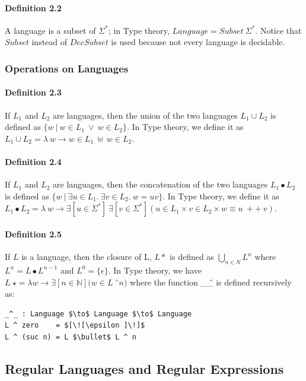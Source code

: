 \documentclass[twoside,openright,final]{bhamthesis}
\begin{document}
\paragraph{Definition 2.2} A language is a subset of 
\(\Sigma^*\); in Type theory, \(Language = Subset\ \Sigma^*\). 
Notice that \(Subset\) instead of \(DecSubset\) is used because not every language is decidable. 

\subsubsection{Operations on Languages}

\paragraph{Definition 2.3} If \(L_1\) and \(L_2\) are languages, then
the union of the two languages \(L_1\cup L_2\) is defined as \(\{w\
|\  w \in L_1\ \vee \ w \in
L_2\}\). In Type theory, we define it as \(L_1 \cup L_2 = \lambda\ w
\to w \in L_1\ \uplus\ w \in L_2\).

\paragraph{Definition 2.4} If \(L_1\) and \(L_2\) are languages, then
the concatenation of the two languages \(L_1\bullet L_2\) is defined
as \(\{w\  |\  \exists u\in L_1.\ \exists v\in L_2.\ w = uv\}\). In
Type theory, we define it as \(L_1\bullet L_2 = \lambda\ w \to \exists[
u \in \Sigma^* ]\ \exists[ v \in \Sigma^* ] ( u \in L_1 \times v \in L_2 \times w \equiv u\ ++\ v ) \).

\paragraph{Definition 2.5} If \(L\) is a language, then the closure of
L, \(L\ast\) is defined as \( \bigcup_{n \in N} L^n \) where
\( L^n = L\bullet L^{n - 1} \) and \(L^0 = \{\epsilon\}\). In Type
theory, we have \(L\ \star = \lambda w \to \exists [ n \in \mathbb{N}
]( w \in L\ \)\^\ \(n)\) where the function \_\^ \_ is defined
recursively as: 
\begin{lstlisting}[mathescape=true,xleftmargin=.3\textwidth,aboveskip=0pt,belowskip=0pt]
_^_ : Language $\to$ Language $\to$ Language
L ^ zero    = $[\![\epsilon ]\!]$
L ^ (suc n) = L $\bullet$ L ^ n
\end{lstlisting}

\subsection{Regular Languages and Regular Expressions}
\end{document}
